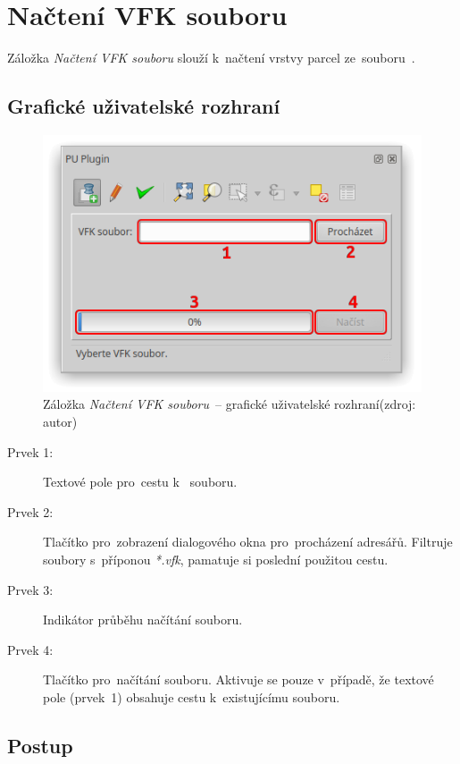 \newpage

\section{Načtení VFK souboru}
\label{manual_nacteni_vfk}

Záložka \textit{Načtení VFK souboru} slouží k~načtení vrstvy parcel
ze~souboru~.

\subsection{Grafické uživatelské rozhraní}
\label{manual_nacteni_gui}

	\begin{figure}[H] \centering
		\includegraphics[width=.55\textwidth]{./pictures/nacteni_vfk_gui.png}
		\caption[Záložka \textit{Načtení VFK souboru}~–
grafické uživatelské rozhraní]{Záložka \textit{Načtení VFK souboru}~–
grafické uživatelské rozhraní\newline (zdroj: autor)}
		\label{fig:manual_nacteni_vfk_gui}
 	\end{figure}

\begin{description}
	\item[Prvek 1:] Textové pole pro~cestu k~ souboru.
	\item[Prvek 2:] Tlačítko pro~zobrazení dialogového okna
pro~procházení adresářů. Filtruje soubory s~příponou \textit{*.vfk},
pamatuje si poslední použitou cestu.
	\item[Prvek 3:] Indikátor průběhu načítání  souboru.
	\item[Prvek 4:] Tlačítko pro~načítání 
souboru. Aktivuje se pouze v~případě, že textové pole (prvek~1)
obsahuje cestu k~existujícímu  souboru.
\end{description}

\subsection{Postup}
\label{manual_nacteni_postup}

